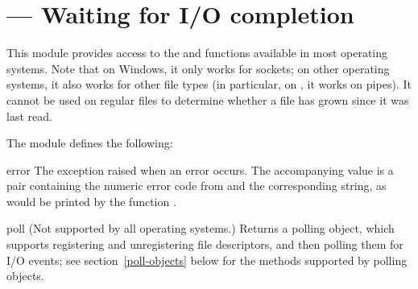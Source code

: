 \section{ ---
         Waiting for I/O completion}



This module provides access to the 
and  functions
available in most operating systems.  Note that on Windows, it only
works for sockets; on other operating systems, it also works for other
file types (in particular, on \UNIX{}, it works on pipes).  It cannot
be used on regular files to determine whether a file has grown since
it was last read.

The module defines the following:

\begin{excdesc}{error}
The exception raised when an error occurs.  The accompanying value is
a pair containing the numeric error code from  and the
corresponding string, as would be printed by the \C{} function
.
\end{excdesc}

\begin{funcdesc}{poll}{}
(Not supported by all operating systems.)  Returns a polling object, 
which supports registering and unregistering file descriptors, and
then polling them for I/O events; 
see section~\ref{poll-objects} below for the methods supported by 
polling objects.
\end{funcdesc}

